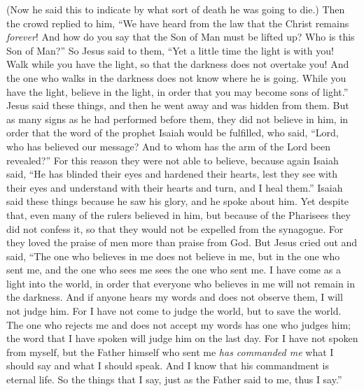 \begin{biblechapter}
\verse (Now he said this to indicate by what sort of death he was going to die.)
\verse Then the crowd replied to him, “We have heard from the law that the Christ remains \textit{forever}! And how do you say that the Son of Man must be lifted up? Who is this Son of Man?”
\verse So Jesus said to them, “Yet a little time the light is with you! Walk while you have the light, so that the darkness does not overtake you! And the one who walks in the darkness does not know where he is going.
\verse While you have the light, believe in the light, in order that you may become sons of light.” Jesus said these things, and then he went away and was hidden from them.
 But as many signs as he had performed before them, they did not believe in him,
\verse in order that the word of the prophet Isaiah would be fulfilled, who said, “Lord, who has believed our message? 
And to whom has the arm of the Lord been revealed?”
\verse For this reason they were not able to believe, because again Isaiah said,
\verse “He has blinded their eyes 
and hardened their hearts, 
lest they see with their eyes 
and understand with their hearts 
and turn, and I heal them.”
\verse Isaiah said these things because he saw his glory, and he spoke about him.
\verse Yet despite that, even many of the rulers believed in him, but because of the Pharisees they did not confess it, so that they would not be expelled from the synagogue.
\verse For they loved the praise of men more than praise from God.
 But Jesus cried out and said, “The one who believes in me does not believe in me, but in the one who sent me,
\verse and the one who sees me sees the one who sent me.
\verse I have come as a light into the world, in order that everyone who believes in me will not remain in the darkness.
\verse And if anyone hears my words and does not observe them, I will not judge him. For I have not come to judge the world, but to save the world.
\verse The one who rejects me and does not accept my words has one who judges him; the word that I have spoken will judge him on the last day.
\verse For I have not spoken from myself, but the Father himself who sent me \textit{has commanded me} what I should say and what I should speak.
\verse And I know that his commandment is eternal life. So the things that I say, just as the Father said to me, thus I say.”
\end{biblechapter}

